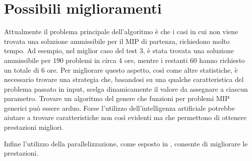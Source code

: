 \section{Possibili miglioramenti}%
\label{sec:Possibili miglioramenti}
Attualmente il problema principale dell'algoritmo è che i casi in cui non
viene trovata una soluzione ammissibile per il MIP di partenza, richiedono
molto tempo.
Ad esempio, nel miglior caso del test 3, è stata trovata una soluzione ammissibile
per 190 problemi in circa 4 ore, mentre i restanti 60 hanno richiesto un totale di 6 ore.
Per migliorare questo aspetto, così come altre statistiche, è
necessario trovare una strategia che, basandosi su una qualche caratteristica
del problema passato in input, scelga dinamicamente il valore da assegnare a
ciascun parametro.
Trovare un algoritmo del genere che funzioni per problemi MIP generici può
essere arduo. 
Forse l'utilizzo dell'intelligenza artificiale potrebbe aiutare a
trovare caratteristiche non così evidenti ma che permettono di ottenere
prestazioni migliori.

Infine l'utilizzo della parallelizzazione, come esposto in \cite{acsPaper},
consente di migliorare le prestazioni.

